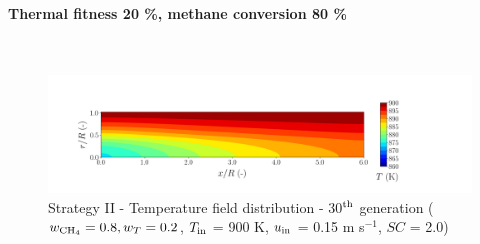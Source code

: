 \documentclass[preprint,12pt]{elsarticle}
\begin{document}

\clearpage


\paragraph{Thermal fitness 20 \%, methane conversion 80 \%} \hspace{0pt} \\
\noindent 

%

\begin{figure}[h!]
\centering
\includegraphics[width=190mm]{results/5Eq/80C_20T/GEN30-TFIELD.png}
\caption{\label{fig:5RES8020G30-TField} Strategy II - Temperature field distribution - 30$^{\rm{th}}$ generation ($w_{\rm{CH_4}} = 0.8, w_T = 0.2$, $T_{\rm{in}}$ = 900 K, $u_{\rm{in}}$ = 0.15 m s$^{-1}$, $SC$ = 2.0)}
\end{figure}

%
\end{document}
